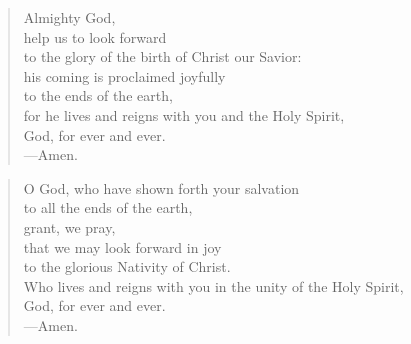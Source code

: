 \prayer

\setlength{\vleftmargin}{\prayerleftmargini}

\begin{verse}
Almighty God,\\
help us to look forward\\
to the glory of the birth of Christ our Savior:\\
his coming is proclaimed joyfully\\
to the ends of the earth,\\
for he lives and reigns with you and the Holy Spirit,\\
God, for ever and ever.\\
{\color{red}---\thinspace}Amen.
\end{verse}


\begin{verse}
O God, who have shown forth your salvation\\
to all the ends of the earth,\\
grant, we pray,\\
that we may look forward in joy\\
to the glorious Nativity of Christ.\\
Who lives and reigns with you in the unity of the Holy Spirit,\\
God, for ever and ever.\\
{\color{red}---\thinspace}Amen.
\end{verse}

\setlength{\vleftmargin}{\defleftmargini}